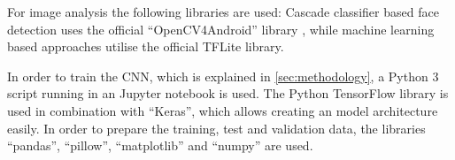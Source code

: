 For image analysis the following libraries are used: Cascade classifier based
face detection uses the official ``OpenCV4Android'' library \cite{opencv4android},
while machine learning based approaches utilise the official TFLite library.
\cite{tensorflow}

In order to train the CNN, which is explained in \ref{sec:methodology}, a
Python 3 script running in an Jupyter notebook is used. 
The Python TensorFlow library is used in combination with ``Keras'',
which allows creating an model architecture easily. In order to prepare the
training, test and validation data, the libraries ``pandas'', ``pillow'', 
``matplotlib'' and ``numpy'' are used.
